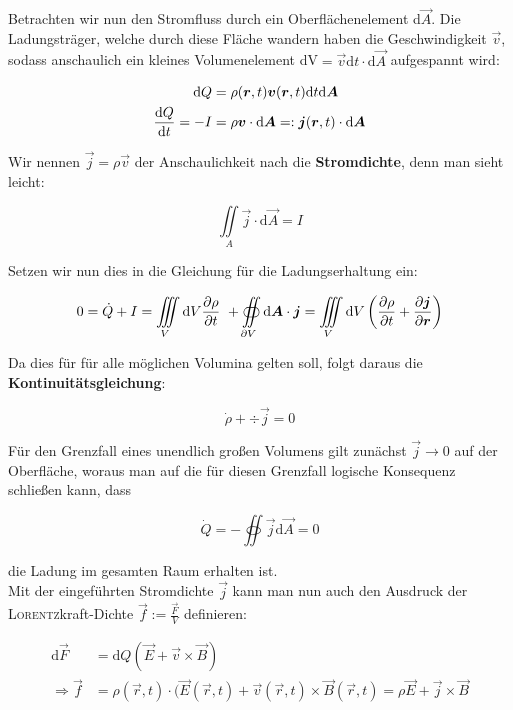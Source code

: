 Betrachten wir nun den Stromfluss durch ein Oberflächenelement d$\vec{A}$. Die Ladungsträger, welche durch diese Fläche wandern haben die Geschwindigkeit $\vec{v}$, sodass anschaulich ein kleines Volumenelement dV$ = \vec{v}\mathrm{d}t\cdot\mathrm{d}\vec{A}$ aufgespannt wird:

\begin{align*}
\mathrm{d}Q &= \rho(\bm{r},t)\bm{v}(\bm{r},t)\mathrm{d}t\mathrm{d}\bm{A}\\
\frac{\mathrm{d}{Q}}{\mathrm{d}{t}} =-I &= \rho\bm{v}\cdot\mathrm{d}\bm{A}=:\bm{j}(\bm{r},t)\cdot\mathrm{d}\bm{A}
\end{align*}

Wir nennen $\vec{j} = \rho\vec{v}$ der Anschaulichkeit nach die \textbf{Stromdichte}, denn man sieht leicht:

\begin{equation*}
\iint\limits_A\vec{j}\cdot\mathrm{d}\vec{A}=I
\end{equation*}

Setzen wir nun dies in die Gleichung für die Ladungserhaltung ein:

\begin{equation*}
0 = \dot{Q} + I = \iiint\limits_V\mathrm{d}V\frac{\partial{\rho}}{\partial{t}} \ + \oiint\limits_{\partial V}\mathrm{d}\bm{A}\cdot\bm{j} = \iiint\limits_V \mathrm{d}V\left(\frac{\partial{\rho}}{\partial{t}} + \frac{\partial{\bm{j}}}{\partial{\bm{r}}}\right) 
\end{equation*}

Da dies für für alle möglichen Volumina gelten soll, folgt daraus die \textbf{Kontinuitätsgleichung}:

\begin{equation*}
\dot{\rho} + \div\vec{j} = 0
\end{equation*} 

Für den Grenzfall eines unendlich großen Volumens gilt zunächst $\vec{j}\rightarrow 0$ auf der Oberfläche, woraus man auf die für diesen Grenzfall logische Konsequenz schließen kann, dass

\begin{equation*}
\dot{Q} = -\oiint\vec{j}\mathrm{d}\vec{A} = 0
\end{equation*}

die Ladung im gesamten Raum erhalten ist.\ \\


Mit der eingeführten Stromdichte $\vec{j}$ kann man nun auch den Ausdruck der \textsc{Lorentz}kraft-Dichte $\vec{f} := \frac{\vec{F}}{V}$ definieren:

\begin{align*}
\mathrm{d}\vec{F} & = \mathrm{d}Q(\vec{E} + \vec{v}\times\vec{B}) \\
\Rightarrow \vec{f} & = \rho(\vec{r},t)\cdot(\vec{E}(\vec{r},t) + \vec{v}(\vec{r},t)\times\vec{B}(\vec{r},t) = \rho\vec{E}+ \vec{j}\times\vec{B}
\end{align*}

